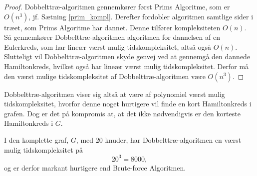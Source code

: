 \begin{proof}
Dobbelttræ-algoritmen gennemkører først Prims Algoritme, som er $O(n^3)$, jf. Sætning \ref{prim_kompl}. 
Derefter fordobler algoritmen samtlige sider i træet, som Prims Algoritme har dannet. Denne tilfører kompleksiteten $O(n)$.
Så gennemkører Dobbelttræ-algoritmen algoritmen for dannelsen af en Eulerkreds, som har lineær værst mulig tidskompleksitet, altså også $O(n)$.
Slutteligt vil Dobbelttræ-algoritmen skyde genvej ved at gennemgå den dannede Hamiltonkreds, hvilket også har lineær værst mulig tidskompleksitet. 
Derfor må den værst mulige tidskompleksitet af Dobbelttræ-algoritmen være $O(n^3)$.
\end{proof}

Dobbelttræ-algoritmen viser sig altså at være af polynomiel værst mulig tidskompleksitet, hvorfor denne noget hurtigere vil finde en kort Hamiltonkreds i grafen. Dog er det på kompromis at, at det ikke nødvendigvis er den korteste Hamiltonkreds i $G$.

\begin{exmp}
I den komplette graf, $G$, med $20$ knuder, har Dobbelttræ-algoritmen en værst mulig tidskompleksitet på $$20^3 = 8000,$$ og er derfor markant hurtigere end Brute-force Algoritmen.
\end{exmp}




